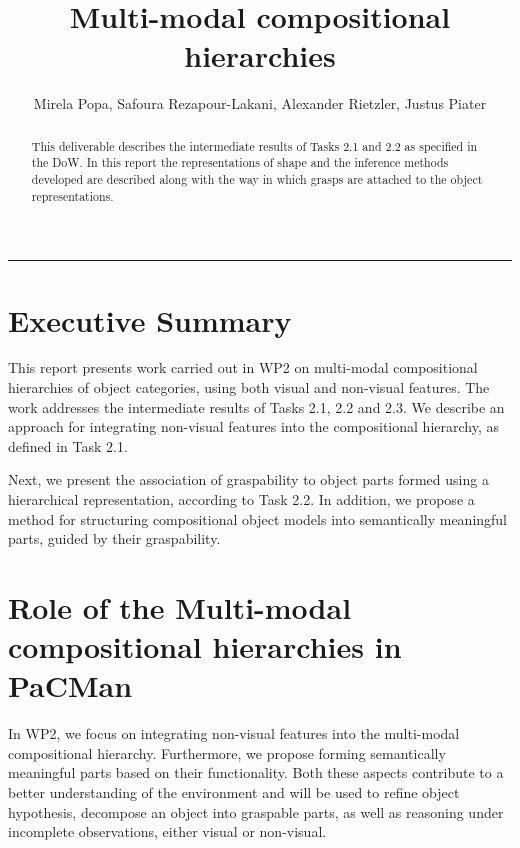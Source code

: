 \documentclass[a4paper,11pt,pdf]{pacmanreport}
\title{Multi-modal compositional hierarchies}
\author{Mirela Popa, Safoura Rezapour-Lakani, Alexander Rietzler, Justus Piater}
\begin{document}
\maketitle

\begin{abstract}
\noindent This deliverable describes the intermediate results of Tasks 2.1 and 2.2 as specified in the DoW. In this report the representations of shape and the inference methods developed are described along with the way in which grasps are attached to the object representations.
\end{abstract}

\vspace{.2em}
\hrule

\footnotesize

\tableofcontents

\normalsize

\newpage

\section*{Executive Summary}

This report presents work carried out in WP2 on multi-modal compositional hierarchies of object categories, using both visual and non-visual features. The work addresses the intermediate results of Tasks 2.1, 2.2 and 2.3. We describe an approach for integrating non-visual features into the compositional hierarchy, as defined in Task 2.1.

Next, we present the association of graspability to object parts formed using a hierarchical representation, according to Task 2.2. In addition, we propose a method for structuring compositional object models into semantically meaningful parts, guided by their graspability.

\section*{Role of the Multi-modal compositional hierarchies in PaCMan}

In WP2, we focus on integrating non-visual features into the multi-modal compositional hierarchy. Furthermore, we propose forming semantically meaningful parts based on their functionality. Both these aspects contribute to a better understanding of the environment and  will be used to refine object hypothesis, decompose an object into graspable parts, as well as reasoning under incomplete observations, either visual or non-visual.
\end{document}
